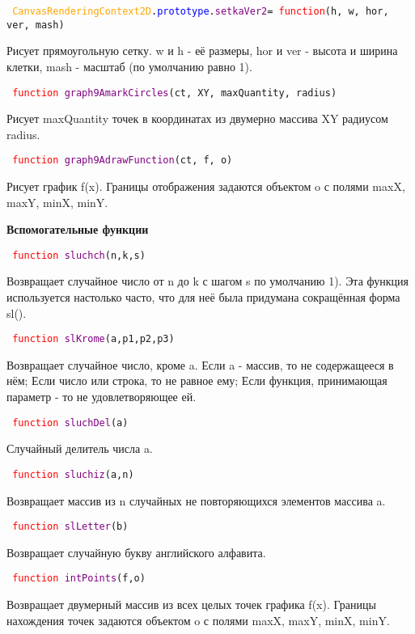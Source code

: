 \texttt{
	\textcolor{Orange}{CanvasRenderingContext2D}.\textcolor{Blue}{prototype}.\textcolor{Purple}{setkaVer2}=
	\newline
	\textcolor{Red}{function}(h, w, hor, ver, mash)
}

Рисует прямоугольную сетку. w и h  \-- её размеры, hor и ver \-- высота и ширина клетки, mash - масштаб (по умолчанию равно 1).

\hypertarget{graph9AmarkCircles}{\texttt{
		\textcolor{Red}{function} \textcolor{Purple}{graph9AmarkCircles}(ct, XY, maxQuantity, radius)
	}}

Рисует maxQuantity точек в координатах из двумерно массива XY радиусом radius.

\hypertarget{graph9AdrawFunction}{\texttt{
		\textcolor{Red}{function} \textcolor{Purple}{graph9AdrawFunction}(ct, f, o)
	}}

Рисует график f(x). Границы отображения задаются объектом o с полями maxX, maxY, minX, minY.

\textbf{Вспомогательные функции}

\hypertarget{sluchch}{\texttt{
		\textcolor{Red}{function} \textcolor{Purple}{sluchch}(n,k,s)
	}}

Возвращает случайное число от n до k с шагом s по умолчанию 1).
Эта функция используется настолько часто, что для неё была придумана сокращённая форма sl().

\hypertarget{slKrome}{\texttt{
		\textcolor{Red}{function} \textcolor{Purple}{slKrome}(a,p1,p2,p3)
	}}

Возвращает случайное число, кроме a. Если a \-- массив, то не содержащееся в нём; Если число или строка, то не равное ему; Если функция, принимающая параметр - то не удовлетворяющее ей.

\texttt{
	\textcolor{Red}{function} \textcolor{Purple}{sluchDel}(a)
}

Случайный делитель числа a.

\texttt{
	\textcolor{Red}{function} \textcolor{Purple}{sluchiz}(a,n)
}

Возвращает массив из n случайных не повторяющихся элементов массива a.

\texttt{
	\textcolor{Red}{function} \textcolor{Purple}{slLetter}(b)
}

Возвращает случайную букву английского алфавита.%

\hypertarget{intPoints}{\texttt{
		\textcolor{Red}{function} \textcolor{Purple}{intPoints}(f,o)
	}}

Возвращает двумерный массив из всех целых точек графика f(x). Границы нахождения точек задаются объектом o с полями maxX, maxY, minX, minY.
\newpage
